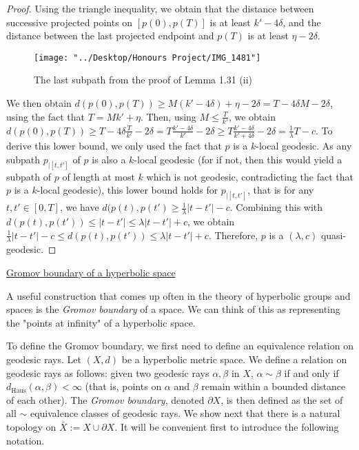 \documentclass[12pt]{article}
\newcommand{\vs}{\vskip10pt}
\begin{document}
\begin{proof}
		Using the triangle inequality, we obtain that the distance between successive projected points on $[p(0), p(T)]$ is at least $k' - 4 \delta$, and the distance between the last projected endpoint and $p(T)$ is at least $\eta - 2 \delta$. 
		
		
\begin{figure} [H]
	\centering
	\texttt{[image: "../Desktop/Honours Project/IMG\_1481"]}
	\caption{The last subpath from the proof of Lemma 1.31 (ii)}
	\label{fig:img1481}
\end{figure}
		
		 We then obtain $d(p(0), p(T)) \geq M(k' - 4 \delta) + \eta - 2 \delta = T - 4 \delta M - 2 \delta$, using the fact that $T = Mk' + \eta$. Then, using $M \leq \frac{T}{k'}$, we obtain $d(p(0), p(T)) \geq T - 4 \delta \frac{T}{k'} - 2 \delta = T \frac{k' - 4 \delta}{k'} - 2 \delta \geq T \frac{k' - 4 \delta}{k' + 4 \delta} - 2 \delta = \frac{1}{\lambda} T - c$. To derive this lower bound, we only used the fact that $p$ is a $k$-local geodesic. As any subpath $p_{\vert [t, t']}$ of $p$ is also a $k$-local geodesic (for if not, then this would yield a subpath of $p$ of length at most $k$ which is not geodesic, contradicting the fact that $p$ is a $k$-local geodesic), this lower bound holds for $p_{\vert [t, t']}$, that is for any $t,t' \in [0, T]$, we have $d(p(t), p(t') \geq \frac{1}{\lambda} \vert t - t' \vert - c$. Combining this with $d(p(t), p(t')) \leq \vert t - t' \vert \leq \lambda \vert t - t' \vert + c$, we obtain $ \frac{1}{\lambda} \vert t - t' \vert - c \leq d(p(t), p(t')) \leq \lambda \vert t - t' \vert + c$. Therefore, $p$ is a $(\lambda, c)$ quasi-geodesic. 
				
	\end{proof}

	\vs 

	\underline{Gromov boundary of a hyperbolic space}
	
	\vs 
	
	A useful construction that comes up often in the theory of hyperbolic groups and spaces is the \textit{Gromov boundary} of a space. We can think of this as representing the "points at infinity" of a hyperbolic space. 
	
	\vs 
	
	To define the Gromov boundary, we first need to define an equivalence relation on geodesic rays. Let $(X,d)$ be a hyperbolic metric space. We define a relation on geodesic rays as follows: given two geodesic rays $\alpha, \beta$ in $X$, $\alpha \sim \beta$ if and only if $d_{\text{Haus}}(\alpha, \beta) < \infty$ (that is, points on $\alpha$ and $\beta$ remain within a bounded distance of each other). The \textit{Gromov boundary}, denoted $\partial X$,  is then defined as the set of all $\sim$ equivalence classes of geodesic rays. We show next that there is a natural topology on $\bar{X} := X \cup \partial X$. It will be convenient first to introduce the following notation. 
	
\end{document}
